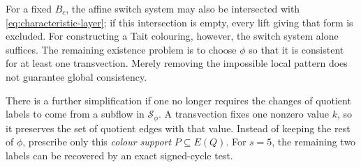 \documentclass[11pt,a4paper]{article}
\theoremstyle{definition}
\theoremstyle{remark}
\begin{document}
For a fixed $B_c$, the affine switch system may also be intersected with \eqref{eq:characteristic-layer}; if this intersection is empty, every lift giving that form is excluded.  For constructing a Tait colouring, however, the switch system alone suffices.  The remaining existence problem is to choose $\phi$ so that it is consistent for at least one transvection.  Merely removing the impossible local pattern does not guarantee global consistency.

There is a further simplification if one no longer requires the changes of quotient labels to come from a subflow in $\mathcal S_\phi$.  A transvection fixes one nonzero value $k$, so it preserves the set of quotient edges with that value.  Instead of keeping the rest of $\phi$, prescribe only this \emph{colour support} $P\subseteq E(Q)$.  For $s=5$, the remaining two labels can be recovered by an exact signed-cycle test.
\end{document}
